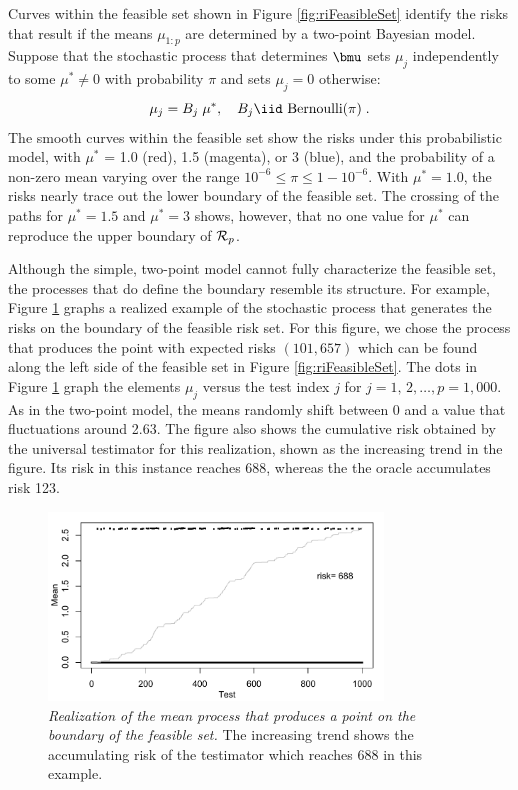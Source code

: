 \documentclass[12pt]{article}
\begin{document}
 Curves within the feasible set shown in Figure \ref{fig:riFeasibleSet} identify
 the risks that result if the means $\mu_{1:p}$ are determined by a two-point
 Bayesian model.  Suppose that the stochastic process that determines $\bmu$
 sets $\mu_j$ independently to some $\mu^{*} \ne 0$ with probability $\pi$ and sets $\mu_j=0$ otherwise:
 \begin{equation}
    \mu_j = B_j \; \mu^{*}, \quad B_j  \iid \mbox{ Bernoulli}(\pi)  \;.
 \label{eq:muj}
 \end{equation}
 The smooth curves within the feasible set show the risks under this
 probabilistic model, with $\mu^{*}$ = 1.0 (red), 1.5 (magenta), or 3 (blue),
 and the probability of a non-zero mean varying over the range $10^{-6} \le \pi
 \le 1-10^{-6}$.  With $\mu^{*} = 1.0$, the risks nearly trace out the lower
 boundary of the feasible set.  The crossing of the paths for $\mu^{*}=1.5$ and
 $\mu^{*}=3$ shows, however, that no one value for $\mu^{*}$ can reproduce the
 upper boundary of ${\cal R}_p$.


 Although the simple, two-point model  cannot fully characterize the feasible set, the processes that do define the boundary resemble its structure.  For example, Figure \ref{fig:simRisk} graphs a realized example of the stochastic process
 that generates the risks on the boundary of the feasible risk set.  For this
 figure, we chose the process that produces the point with expected risks $(101,
 657)$ which can be found along the left side of the feasible set in Figure \ref{fig:riFeasibleSet}.
  The dots in Figure \ref{fig:simRisk} graph the elements $\mu_j$ versus the
 test index $j$ for $j = 1,\,2, \ldots, p=1,000$.  As in the two-point model, the means randomly shift between 0 and a value that fluctuations around 2.63.  The figure also shows the cumulative risk obtained by the universal testimator for this realization, shown as the increasing trend in the
 figure.  Its risk in this instance reaches 688,
 whereas the the oracle accumulates risk 123.


\begin{figure}
 \caption{ \label{fig:simRisk} {\sl Realization of the mean process that
 produces a point on the boundary of the feasible set.} The increasing trend
 shows the accumulating risk of the testimator which reaches 688 in this
 example.  }

 \vspace{0.1in}
 \centerline{
 \includegraphics[width=3.5in]{figures/simRisk}    }
 \vspace{0.2in}
\end{figure}
\end{document}

